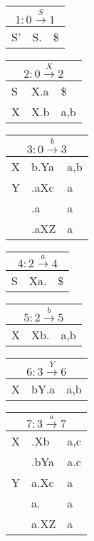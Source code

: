 \documentclass[11pt]{scrartcl}
\begin{document}
	\begin{table}[h]
		\begin{tabular}[t]{l|l|l}
			\multicolumn{3}{c}{$1: 0 \xrightarrow{S} 1$} \\ \hline
			S' & S. & \$ \\ 
		\end{tabular}
		\begin{tabular}[t]{l|l|l}
			\multicolumn{3}{c}{$2: 0 \xrightarrow{X} 2$} \\ \hline
			S & X.a & \$ \\ \hline
			X & X.b & a,b 
		\end{tabular}
		\begin{tabular}[t]{l|l|l}
			\multicolumn{3}{c}{$3: 0 \xrightarrow{b} 3$} \\ \hline
			X & b.Ya & a,b \\ \hline
			Y & .aXc & a \\ 
			& .a & a \\
			& .aXZ & a 
		\end{tabular}
	\end{table}
	
	\begin{table}[h]
		\begin{tabular}[t]{l|l|l}
			\multicolumn{3}{c}{$4: 2 \xrightarrow{a} 4$} \\ \hline
			S & Xa. & \$ \\ 
		\end{tabular}
		\begin{tabular}[t]{l|l|l}
			\multicolumn{3}{c}{$5: 2 \xrightarrow{b} 5$} \\ \hline
			X & Xb. & a,b \\ 
		\end{tabular}
		\begin{tabular}[t]{l|l|l}
			\multicolumn{3}{c}{$6: 3 \xrightarrow{Y} 6$} \\ \hline
			X & bY.a & a,b \\ 
		\end{tabular}
		\begin{tabular}[t]{l|l|l}
			\multicolumn{3}{c}{$7: 3 \xrightarrow{a} 7$} \\ \hline
			X & .Xb & a,c \\
			& .bYa &a.c \\ \hline
			Y & a.Xc & a \\
			& a. & a \\
			& a.XZ & a 
		\end{tabular}
	\end{table}
		
\end{document}
